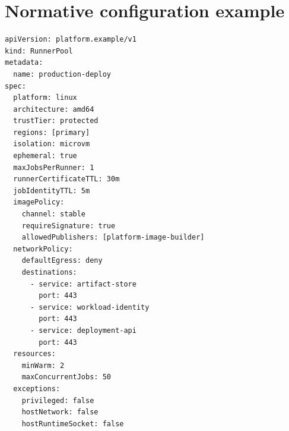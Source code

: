 \section{Normative configuration example}

\begin{lstlisting}[caption={Abbreviated protected runner-pool configuration},label={lst:pool}]
apiVersion: platform.example/v1
kind: RunnerPool
metadata:
  name: production-deploy
spec:
  platform: linux
  architecture: amd64
  trustTier: protected
  regions: [primary]
  isolation: microvm
  ephemeral: true
  maxJobsPerRunner: 1
  runnerCertificateTTL: 30m
  jobIdentityTTL: 5m
  imagePolicy:
    channel: stable
    requireSignature: true
    allowedPublishers: [platform-image-builder]
  networkPolicy:
    defaultEgress: deny
    destinations:
      - service: artifact-store
        port: 443
      - service: workload-identity
        port: 443
      - service: deployment-api
        port: 443
  resources:
    minWarm: 2
    maxConcurrentJobs: 50
  exceptions:
    privileged: false
    hostNetwork: false
    hostRuntimeSocket: false
\end{lstlisting}
